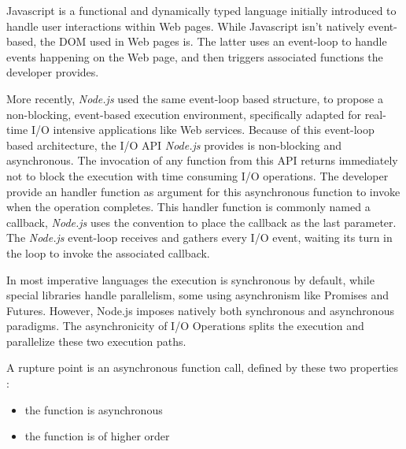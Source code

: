 
Javascript is a functional and dynamically typed language initially introduced to handle user interactions within Web pages.
While Javascript isn't natively event-based, the DOM used in Web pages is.
The latter uses an event-loop to handle events happening on the Web page, and then triggers associated functions the developer provides.

More recently, \textit{Node.js} used the same event-loop based structure, to propose a non-blocking, event-based execution environment, specifically adapted for real-time I/O intensive applications like Web services.
Because of this event-loop based architecture, the I/O API \textit{Node.js} provides is non-blocking and asynchronous.
The invocation of any function from this API returns immediately not to block the execution with time consuming I/O operations.
The developer provide an handler function as argument for this asynchronous function to invoke when the operation completes.
This handler function is commonly named a callback, \textit{Node.js} uses the convention to place the callback as the last parameter.
The \textit{Node.js} event-loop receives and gathers every I/O event, waiting its turn in the loop to invoke the associated callback.

In most imperative languages the execution is synchronous by default, while special libraries handle parallelism, some using asynchronism like Promises\cite{Liskov1988} and Futures.
However, Node.js imposes natively both synchronous and asynchronous paradigms.
The asynchronicity of I/O Operations splits the execution and parallelize these two execution paths.

A rupture point is an asynchronous function call, defined by these two properties :
\begin{itemize}
 \item the function is asynchronous
 \item the function is of higher order
\end{itemize}


